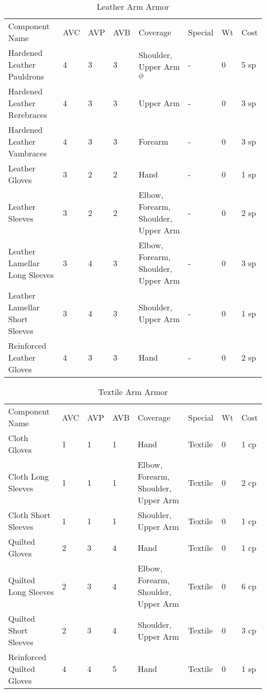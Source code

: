 \documentclass[oneside,11pt,english]{book}
\begin{document}
\begin{longtabu}to 
	\caption{Leather Arm Armor}
	\label{tab:Leather Arm Armor}\\
Component Name&AVC&AVP&AVB& Coverage& Special& Wt&Cost\\
Hardened Leather Pauldrons& 4& 3& 3& Shoulder, Upper Arm$\phi$ &-& 0& 5 sp\\
Hardened Leather Rerebraces& 4& 3& 3& Upper Arm &-& 0& 3 sp\\
Hardened Leather Vambraces& 4& 3& 3& Forearm &-& 0& 3 sp\\
Leather Gloves& 3& 2& 2& Hand &-& 0& 1 sp\\
Leather Sleeves& 3& 2& 2& Elbow, Forearm, Shoulder, Upper Arm &-& 0& 2 sp\\
Leather Lamellar Long Sleeves& 3& 4& 3& Elbow, Forearm, Shoulder, Upper Arm &-& 0& 3 sp\\
Leather Lamellar Short Sleeves& 3& 4& 3& Shoulder, Upper Arm &-& 0& 1 sp\\
Reinforced Leather Gloves& 4& 3& 3& Hand &-& 0& 2 sp\\
\end{longtabu}

\begin{longtabu} to 
	\caption{Textile Arm Armor}
	\label{tab:Textile Arm Armor}\\
Component Name&AVC&AVP&AVB& Coverage& Special& Wt&Cost\\
Cloth Gloves& 1& 1& 1& Hand& Textile& 0& 1 cp\\
Cloth Long Sleeves& 1& 1& 1& Elbow, Forearm, Shoulder, Upper Arm& Textile& 0& 2 cp\\
Cloth Short Sleeves& 1& 1& 1& Shoulder, Upper Arm& Textile& 0& 1 cp\\
Quilted Gloves& 2& 3& 4& Hand& Textile& 0& 1 cp\\
Quilted Long Sleeves& 2& 3& 4& Elbow, Forearm, Shoulder, Upper Arm& Textile& 0& 6 cp\\
Quilted Short Sleeves& 2& 3& 4& Shoulder, Upper Arm& Textile& 0& 3 cp\\
Reinforced Quilted Gloves& 4& 4& 5& Hand& Textile& 0& 1 sp\\
\end{longtabu}
\end{document}
